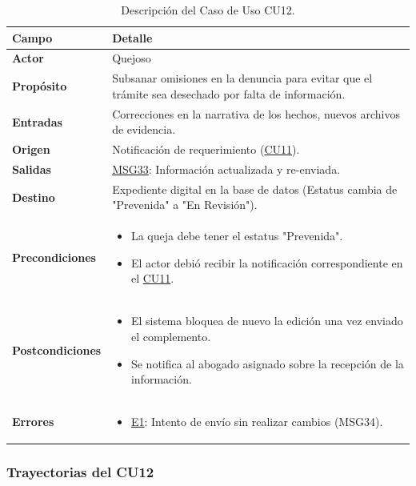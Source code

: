 \begin{appendices}
\begin{table}[htbp]
\centering
\small
\begin{tabular}{|p{3.5cm}|p{10.5cm}|}
\hline
\rowcolor[HTML]{EFEFEF} 
\textbf{Campo} & \textbf{Detalle} \\ \hline
\textbf{Actor} & Quejoso \\ \hline
\textbf{Propósito} & Subsanar omisiones en la denuncia para evitar que el trámite sea desechado por falta de información. \\ \hline
\textbf{Entradas} & Correcciones en la narrativa de los hechos, nuevos archivos de evidencia. \\ \hline
\textbf{Origen} & Notificación de requerimiento (\hyperlink{anexo:casos_uso}{CU11}). \\ \hline
\textbf{Salidas} & \hyperlink{msg:MSG33}{MSG33}: Información actualizada y re-enviada. \\ \hline
\textbf{Destino} & Expediente digital en la base de datos (Estatus cambia de "Prevenida" a "En Revisión"). \\ \hline
\textbf{Precondiciones} & 
\begin{itemize}[nosep, leftmargin=*]
    \item La queja debe tener el estatus "Prevenida".
    \item El actor debió recibir la notificación correspondiente en el \hyperlink{anexo:casos_uso}{CU11}.
\end{itemize} \\ \hline
\textbf{Postcondiciones} & 
\begin{itemize}[nosep, leftmargin=*]
    \item El sistema bloquea de nuevo la edición una vez enviado el complemento.
    \item Se notifica al abogado asignado sobre la recepción de la información.
\end{itemize} \\ \hline
\textbf{Errores} & 
\begin{itemize}[nosep, leftmargin=*]
    \item \hyperlink{err:E17}{E1}: Intento de envío sin realizar cambios (MSG34).
\end{itemize} \\ \hline
\end{tabular}
\caption{Descripción del Caso de Uso CU12.}
\label{tab:cu12_especificacion}
\end{table}

\subsubsection{Trayectorias del CU12}


\end{appendices}
